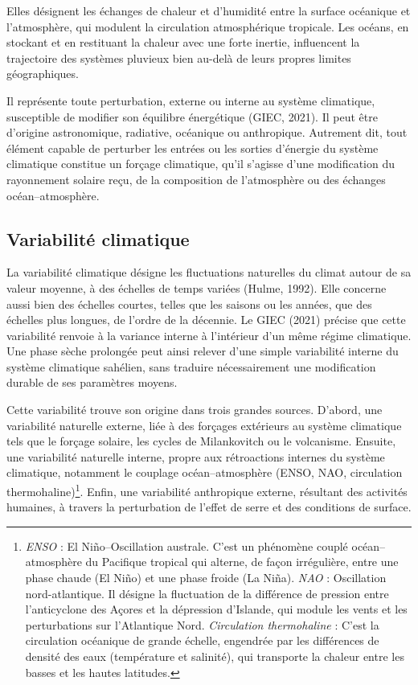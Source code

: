 Elles désignent les échanges de chaleur et d'humidité entre la surface océanique et l'atmosphère, qui modulent la circulation atmosphérique tropicale. Les océans, en stockant et en restituant la chaleur avec une forte inertie, influencent la trajectoire des systèmes pluvieux bien au-delà de leurs propres limites géographiques.

Il représente toute perturbation, externe ou interne au système climatique, susceptible de modifier son équilibre énergétique (GIEC, 2021). Il peut être d'origine astronomique, radiative, océanique ou anthropique. Autrement dit, tout élément capable de perturber les entrées ou les sorties d'énergie du système climatique constitue un forçage climatique, qu'il s'agisse d'une modification du rayonnement solaire reçu, de la composition de l'atmosphère ou des échanges océan--atmosphère.

\subsection{Variabilité climatique}

La variabilité climatique désigne les fluctuations naturelles du climat autour de sa valeur moyenne, à des échelles de temps variées (Hulme, 1992). Elle concerne aussi bien des échelles courtes, telles que les saisons ou les années, que des échelles plus longues, de l'ordre de la décennie. Le GIEC (2021) précise que cette variabilité renvoie à la variance interne à l'intérieur d'un même régime climatique. Une phase sèche prolongée peut ainsi relever d'une simple variabilité interne du système climatique sahélien, sans traduire nécessairement une modification durable de ses paramètres moyens.

Cette variabilité trouve son origine dans trois grandes sources. D’abord, une variabilité naturelle externe, liée à des forçages extérieurs au système climatique tels que le forçage solaire, les cycles de Milankovitch ou le volcanisme. Ensuite, une variabilité naturelle interne, propre aux rétroactions internes du système climatique, notamment le couplage océan--atmosphère (ENSO, NAO, circulation thermohaline)\footnote{\textit{ENSO} : El Niño--Oscillation australe. C’est un phénomène couplé océan--atmosphère du Pacifique tropical qui alterne, de façon irrégulière, entre une phase chaude (El Niño) et une phase froide (La Niña). \textit{NAO} : Oscillation nord-atlantique. Il désigne la fluctuation de la différence de pression entre l’anticyclone des Açores et la dépression d’Islande, qui module les vents et les perturbations sur l’Atlantique Nord. \textit{Circulation thermohaline} : C’est la circulation océanique de grande échelle, engendrée par les différences de densité des eaux (température et salinité), qui transporte la chaleur entre les basses et les hautes latitudes.}. Enfin, une variabilité anthropique externe, résultant des activités humaines, à travers la perturbation de l'effet de serre et des conditions de surface.

